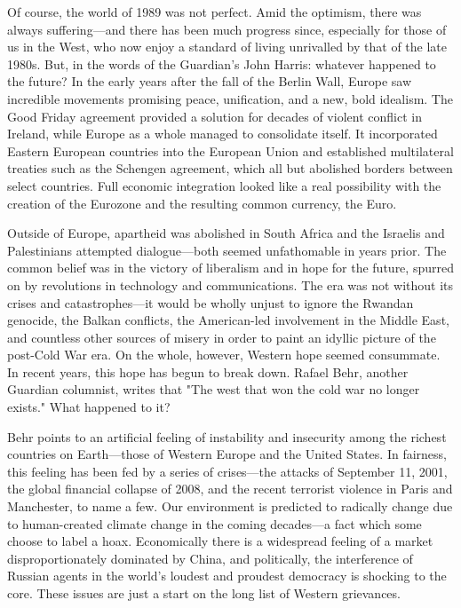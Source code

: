    Of course, the world of 1989 was not perfect. Amid the optimism, there
   was always suffering---and there has been much progress since,
   especially for those of us in the West, who now enjoy a standard of
   living unrivalled by that of the late 1980s. But, in the words of the
   Guardian's John Harris: whatever happened to the future? In the early
   years after the fall of the Berlin Wall, Europe saw incredible
   movements promising peace, unification, and a new, bold idealism. The
   Good Friday agreement provided a solution for decades of violent
   conflict in Ireland, while Europe as a whole managed to consolidate
   itself. It incorporated Eastern European countries into the European
   Union and established multilateral treaties such as the Schengen
   agreement, which all but abolished borders between select countries.
   Full economic integration looked like a real possibility with the
   creation of the Eurozone and the resulting common currency, the Euro.

   Outside of Europe, apartheid was abolished in South Africa and the
   Israelis and Palestinians attempted dialogue---both seemed unfathomable
   in years prior. The common belief was in the victory of liberalism and
   in hope for the future, spurred on by revolutions in technology and
   communications. The era was not without its crises and catastrophes---it
   would be wholly unjust to ignore the Rwandan genocide, the Balkan
   conflicts, the American-led involvement in the Middle East, and
   countless other sources of misery in order to paint an idyllic picture
   of the post-Cold War era. On the whole, however, Western hope seemed
   consummate. In recent years, this hope has begun to break down. Rafael
   Behr, another Guardian columnist, writes that "The west that won the
   cold war no longer exists." What happened to it?

   Behr points to an artificial feeling of instability and insecurity
   among the richest countries on Earth---those of Western Europe and the
   United States. In fairness, this feeling has been fed by a series of
   crises---the attacks of September 11, 2001, the global financial
   collapse of 2008, and the recent terrorist violence in Paris and
   Manchester, to name a few. Our environment is predicted to radically
   change due to human-created climate change in the coming decades---a
   fact which some choose to label a hoax. Economically there is a
   widespread feeling of a market disproportionately dominated by China,
   and politically, the interference of Russian agents in the world's
   loudest and proudest democracy is shocking to the core. These issues
   are just a start on the long list of Western grievances.

